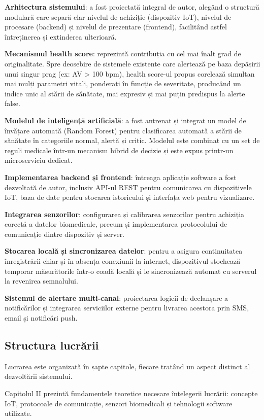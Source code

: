 ﻿\documentclass[12pt,a4paper,twoside]{article}
\begin{document}
\textbf{Arhitectura sistemului}: a fost proiectată integral de autor, alegând o structură modulară care separă clar nivelul de achiziție (dispozitiv IoT), nivelul de procesare (backend) și nivelul de prezentare (frontend), facilitând astfel întreținerea și extinderea ulterioară.

\textbf{Mecanismul health score}: reprezintă contribuția cu cel mai înalt grad de originalitate. Spre deosebire de sistemele existente care alertează pe baza depășirii unui singur prag (ex: AV > 100 bpm), health score-ul propus corelează simultan mai mulți parametri vitali, ponderați în funcție de severitate, producând un indice unic al stării de sănătate, mai expresiv și mai puțin predispus la alerte false.

\textbf{Modelul de inteligență artificială}: a fost antrenat și integrat un model de învățare automată (Random Forest) pentru clasificarea automată a stării de sănătate în categoriile normal, alertă și critic. Modelul este combinat cu un set de reguli medicale într-un mecanism hibrid de decizie și este expus printr-un microserviciu dedicat.

\textbf{Implementarea backend și frontend}: întreaga aplicație software a fost dezvoltată de autor, inclusiv API-ul REST pentru comunicarea cu dispozitivele IoT, baza de date pentru stocarea istoricului și interfața web pentru vizualizare.

\textbf{Integrarea senzorilor}: configurarea și calibrarea senzorilor pentru achiziția corectă a datelor biomedicale, precum și implementarea protocolului de comunicație dintre dispozitiv și server.

\textbf{Stocarea locală și sincronizarea datelor}: pentru a asigura continuitatea înregistrării chiar și în absența conexiunii la internet, dispozitivul stochează temporar măsurătorile într-o coadă locală și le sincronizează automat cu serverul la revenirea semnalului.

\textbf{Sistemul de alertare multi-canal}: proiectarea logicii de declanșare a notificărilor și integrarea serviciilor externe pentru livrarea acestora prin SMS, email și notificări push.

\subsection{Structura lucrării}

Lucrarea este organizată în șapte capitole, fiecare tratând un aspect distinct al dezvoltării sistemului.

Capitolul II prezintă fundamentele teoretice necesare înțelegerii lucrării: concepte IoT, protocoale de comunicație, senzori biomedicali și tehnologii software utilizate.
\end{document}
